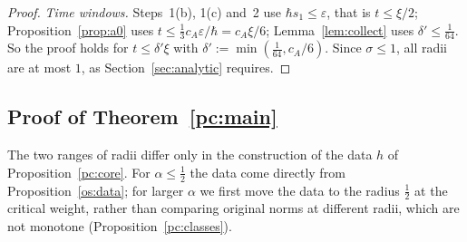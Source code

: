 \begin{proof}
\medskip\noindent\emph{Time windows.} Steps~1(b), 1(c) and~2 use $\hbar s_1\le\varepsilon$, that is $t\le\xi/2$; Proposition~\ref{prop:a0} uses
$t\le\tfrac13c_A\varepsilon/\hbar=c_A\xi/6$; Lemma~\ref{lem:collect} uses $\delta'\le\tfrac1{64}$. So the proof holds for $t\le\delta'\xi$ with
$\delta':=\min(\tfrac1{64},c_A/6)$.
Since $\sigma\le1$, all radii are at most $1$, as Section~\ref{sec:analytic} requires.
\end{proof}

\subsection{Proof of Theorem~\texorpdfstring{\ref{pc:main}}{1.1}}\label{subsec:pc-all}
The two ranges of radii differ only in the construction of the data $h$ of Proposition~\ref{pc:core}. For $\alpha\le\tfrac12$
the data come directly from Proposition~\ref{os:data}; for larger $\alpha$ we first move the data to the radius $\tfrac12$ at
the critical weight, rather than comparing original norms at different radii, which are not monotone (Proposition~\ref{pc:classes}).

